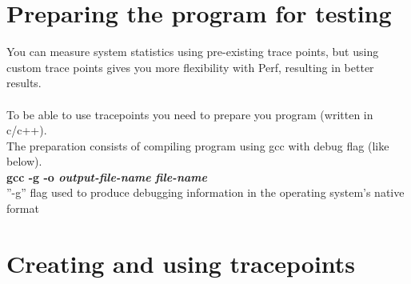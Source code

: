 \documentclass[11pt,onecolumn]{article}
\begin{document}
\newpage
\section{Preparing the program for testing}

You can measure system statistics using pre-existing trace points, but using custom trace points gives you more flexibility with Perf, resulting in better results.\\\\
To be able to use tracepoints you need to prepare you program (written in c/c++).\\
The preparation consists of compiling program using gcc with debug flag (like below).\\
\quad\textbf{gcc -g -o \textit{output-file-name} \textit{file-name}}\\
”-g” flag used to produce debugging information in the operating system’s native format

\section{Creating and using tracepoints}
\end{document}
